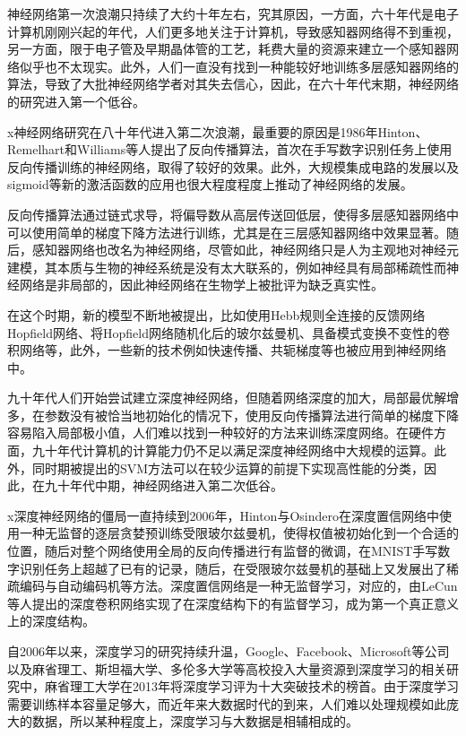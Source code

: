 神经网络第一次浪潮只持续了大约十年左右，究其原因，一方面，六十年代是电子计算机刚刚兴起的年代，人们更多地关注于计算机，导致感知器网络得不到重视，另一方面，限于电子管及早期晶体管的工艺，耗费大量的资源来建立一个感知器网络似乎也不太现实。此外，人们一直没有找到一种能较好地训练多层感知器网络的算法，导致了大批神经网络学者对其失去信心，因此，在六十年代末期，神经网络的研究进入第一个低谷。

x神经网络研究在八十年代进入第二次浪潮，最重要的原因是1986年Hinton、Remelhart和Williams等人提出了反向传播算法，首次在手写数字识别任务上使用反向传播训练的神经网络，取得了较好的效果。此外，大规模集成电路的发展以及sigmoid等新的激活函数的应用也很大程度程度上推动了神经网络的发展。

反向传播算法通过链式求导，将偏导数从高层传送回低层，使得多层感知器网络中可以使用简单的梯度下降方法进行训练，尤其是在三层感知器网络中效果显著。随后，感知器网络也改名为神经网络，尽管如此，神经网络只是人为主观地对神经元建模，其本质与生物的神经系统是没有太大联系的，例如神经具有局部稀疏性而神经网络是非局部的，因此神经网络在生物学上被批评为缺乏真实性。

在这个时期，新的模型不断地被提出，比如使用Hebb规则全连接的反馈网络Hopfield网络、将Hopfield网络随机化后的玻尔兹曼机、具备模式变换不变性的卷积网络等，此外，一些新的技术例如快速传播、共轭梯度等也被应用到神经网络中。

九十年代人们开始尝试建立深度神经网络，但随着网络深度的加大，局部最优解增多，在参数没有被恰当地初始化的情况下，使用反向传播算法进行简单的梯度下降容易陷入局部极小值，人们难以找到一种较好的方法来训练深度网络。在硬件方面，九十年代计算机的计算能力仍不足以满足深度神经网络中大规模的运算。此外，同时期被提出的SVM方法可以在较少运算的前提下实现高性能的分类，因此，在九十年代中期，神经网络进入第二次低谷。

x深度神经网络的僵局一直持续到2006年，Hinton与Osindero在深度置信网络中使用一种无监督的逐层贪婪预训练受限玻尔兹曼机，使得权值被初始化到一个合适的位置，随后对整个网络使用全局的反向传播进行有监督的微调，在MNIST手写数字识别任务上超越了已有的记录，随后，在受限玻尔兹曼机的基础上又发展出了稀疏编码与自动编码机等方法。深度置信网络是一种无监督学习，对应的，由LeCun等人提出的深度卷积网络实现了在深度结构下的有监督学习，成为第一个真正意义上的深度结构。

自2006年以来，深度学习的研究持续升温，Google、Facebook、Microsoft等公司以及麻省理工、斯坦福大学、多伦多大学等高校投入大量资源到深度学习的相关研究中，麻省理工大学在2013年将深度学习评为十大突破技术的榜首。由于深度学习需要训练样本容量足够大，而近年来大数据时代的到来，人们难以处理规模如此庞大的数据，所以某种程度上，深度学习与大数据是相辅相成的。

